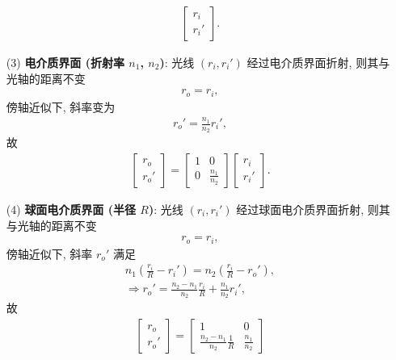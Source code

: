\documentclass[twoside]{note}
\begin{document}
\begin{pf}
\begin{itemize}
\begin{align}
\begin{bmatrix}
                r_i\\
                r_i'
            \end{bmatrix}.
        \end{align}
        \item[(3)] \textbf{电介质界面 (折射率 $n_1$, $n_2$)}: 光线 $(r_i,r_i')$ 经过电介质界面折射, 则其与光轴的距离不变
        \begin{align}
            r_o=r_i,
        \end{align}
        傍轴近似下, 斜率变为
        \begin{align}
            r_o'=\frac{n_1}{n_2}r_i',
        \end{align}
        故
        \begin{align}
            \begin{bmatrix}
                r_o\\
                r_o'
            \end{bmatrix}=\begin{bmatrix}
                1&0\\
                0&\frac{n_1}{n_2}
            \end{bmatrix}\begin{bmatrix}
                r_i\\
                r_i'
            \end{bmatrix}.
        \end{align}
        \item[(4)] \textbf{球面电介质界面 (半径 $R$)}: 光线 $(r_i,r_i')$ 经过球面电介质界面折射, 则其与光轴的距离不变
        \begin{align}
            r_o=r_i,
        \end{align}
        傍轴近似下, 斜率 $r_o'$ 满足
        \begin{gather}
            n_1\left(\frac{r_i}{R}-r_i'\right)=n_2\left(\frac{r_i}{R}-r_o'\right),\\
            \Longrightarrow r_o'=\frac{n_2-n_1}{n_2}\frac{r_i}{R}+\frac{n_1}{n_2}r_i',
        \end{gather}
        故
        \begin{align}
            \begin{bmatrix}
                r_o\\
                r_o'
            \end{bmatrix}=\begin{bmatrix}
                1&0\\
                \frac{n_2-n_1}{n_2}\frac{1}{R}&\frac{n_1}{n_2}

\end{bmatrix}
\end{align}
\end{itemize}
\end{pf}
\end{document}
